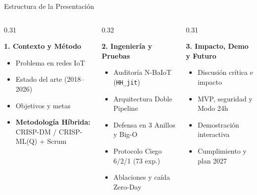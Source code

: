 \documentclass[aspectratio=169, 10pt]{beamer}
\begin{document}
\begin{frame}{Estructura de la Presentación}
  \begin{columns}[T]
    \begin{column}{0.31\textwidth}
      \begin{block}{\textbf{1. Contexto y Método}}
        \footnotesize
        \begin{itemize}
          \item Problema en redes IoT
          \item Estado del arte (2018--2026)
          \item Objetivos y metas
          \item \textbf{Metodología Híbrida:}\\CRISP-DM / CRISP-ML(Q) + Scrum
        \end{itemize}
      \end{block}
    \end{column}
    \begin{column}{0.32\textwidth}
      \begin{block}{\textbf{2. Ingeniería y Pruebas}}
        \footnotesize
        \begin{itemize}
          \item Auditoría N-BaIoT (\texttt{HH\_jit})
          \item Arquitectura Doble Pipeline
          \item Defensa en 3 Anillos y Big-O
          \item Protocolo Ciego 6/2/1 (73 exp.)
          \item Ablaciones y caída Zero-Day
        \end{itemize}
      \end{block}
    \end{column}
    \begin{column}{0.31\textwidth}
      \begin{exampleblock}{\textbf{3. Impacto, Demo y Futuro}}
        \footnotesize
        \begin{itemize}
          \item Discusión crítica e impacto
          \item MVP, seguridad y Modo 24h
          \item Demostración interactiva
          \item Cumplimiento y plan 2027
        \end{itemize}
      \end{exampleblock}
    \end{column}
  \end{columns}
\end{frame}
\end{document}
